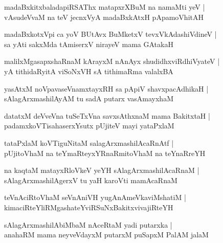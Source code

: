 \documentclass[twoside,12pt,openright]{book}
\newcounter{shloka}[chapter]
\begin{document}
\begin{shloka}%
madaBxkitxbaladapiRSAThx matapxrXBuM na namaMti yeV |\\
vAsudeVvaM na teV jecnxVyA madaBxkAtxH pApamoVhitAH
\end{shloka}

\begin{shloka}%
madaBxkotxVpi ca yoV BUtAvx BuMketxV tevxVkAdashiVdineV |\\
sa yAti sakxMda tAmiserxV nirayeV mama GAtakaH 
\end{shloka}

\begin{shloka}%
malilxMgasapxshaRnaM kArayxM nAnAyx shudidhxviRdhiVyateV |\\
yA tithidaRyitA viSoNxVH sA tithimaRma valalxBA
\end{shloka}

\begin{shloka}%
yasAtxM noVpavaseVnamxtayxRH sa pApiV shavxpacAdhikaH |\\
sAlagArxmashilAyAM tu sadA putarx vasAmayxhaM 
\end{shloka}

\begin{shloka}%
datatxM deVveVna tuSeTxVna savxsAthxnaM mama BakitxtaH |\\
padamxkoVTisahaserxYsutx pUjiteV mayi yataPxlaM 
\end{shloka}

\begin{shloka}%
tataPxlaM koVTiguNitaM salagArxmashilAcaRnAtf |\\
pUjitoVhaM na teYmaRteyxYRnaRmitoVhaM na teYnaRreYH
\end{shloka}

\begin{shloka}%
na kaqtaM matayxRloVkeV yeYH sAlagArxmashilAcaRnaM |\\
sAlagArxmashilAgerxV tu yaH karoVti mamAcaRnaM 
\end{shloka}

\begin{shloka}%
teVnAciRtoVhaM seVnAniVH yugAnAmeVkaviMshatiM |\\
kimaciRteYliRMgashateYviRSuNxBakitxvivajiRteYH
\end{shloka}

\begin{shloka}%
sAlagArxmashilAbiMbaM nAceRtaM yadi putarxka |\\
anahaRM mama neyveVdayxM putarxM puSapxM PalAM jalaM 
\end{shloka}
\end{document}
